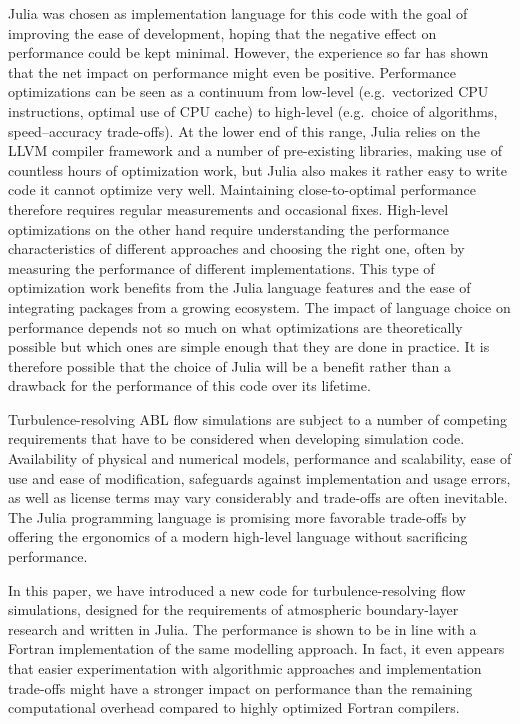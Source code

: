 \documentclass[gmd, manuscript]{copernicus}
\begin{document}
Julia was chosen as implementation language for this code with the goal of improving the ease of development, hoping that the negative effect on performance could be kept minimal.
However, the experience so far has shown that the net impact on performance might even be positive.
Performance optimizations can be seen as a continuum from low-level (e.g.~vectorized CPU instructions, optimal use of CPU cache) to high-level (e.g.~choice of algorithms, speed--accuracy trade-offs).
At the lower end of this range, Julia relies on the LLVM compiler framework and a number of pre-existing libraries, making use of countless hours of optimization work, but Julia also makes it rather easy to write code it cannot optimize very well.
Maintaining close-to-optimal performance therefore requires regular measurements and occasional fixes.
High-level optimizations on the other hand require understanding the performance characteristics of different approaches and choosing the right one, often by measuring the performance of different implementations.
This type of optimization work benefits from the Julia language features and the ease of integrating packages from a growing ecosystem.
The impact of language choice on performance depends not so much on what optimizations are theoretically possible but which ones are simple enough that they are done in practice.
It is therefore possible that the choice of Julia will be a benefit rather than a drawback for the performance of this code over its lifetime.

\conclusions  %
Turbulence-resolving ABL flow simulations are subject to a number of competing requirements that have to be considered when developing simulation code. Availability of physical and numerical models, performance and scalability, ease of use and ease of modification, safeguards against implementation and usage errors, as well as license terms may vary considerably and trade-offs are often inevitable.
The Julia programming language is promising more favorable trade-offs by offering the ergonomics of a modern high-level language without sacrificing performance.

In this paper, we have introduced a new code for turbulence-resolving flow simulations, designed for the requirements of atmospheric boundary-layer research and written in Julia.
The performance is shown to be in line with a Fortran implementation of the same modelling approach.
In fact, it even appears that easier experimentation with algorithmic approaches and implementation trade-offs might have a stronger impact on performance than the remaining computational overhead compared to highly optimized Fortran compilers.
\end{document}
